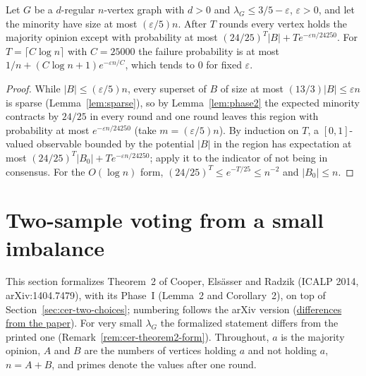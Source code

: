 \begin{theorem}[Theorem~4]\label{thm:expander}
\leanok{}
Let $G$ be a $d$-regular $n$-vertex graph with $d>0$ and $\lambda_G\le3/5-\varepsilon$, $\varepsilon>0$,
and let the minority have size at most $(\varepsilon/5)n$. After $T$ rounds every vertex holds
the majority opinion except with probability at most
$(24/25)^T|B|+Te^{-\varepsilon n/24250}$. For $T=\lceil C\log n\rceil$ with $C=25000$ the failure
probability is at most $1/n+(C\log n+1)e^{-\varepsilon n/C}$, which tends to $0$ for fixed
$\varepsilon$.
\end{theorem}
\begin{proof}\leanok
While $|B|\le(\varepsilon/5)n$, every superset of $B$ of size at most $(13/3)|B|\le\varepsilon n$
is sparse (Lemma~\ref{lem:sparse}), so by Lemma~\ref{lem:phase2} the expected minority contracts by
$24/25$ in every round and one round leaves this region with probability at most
$e^{-\varepsilon n/24250}$ (take $m=(\varepsilon/5)n$). By induction on $T$, a $[0,1]$-valued
observable bounded by the potential $|B|$ in the region has expectation at most
$(24/25)^T|B_0|+Te^{-\varepsilon n/24250}$; apply it to the indicator of not being in consensus.
For the $O(\log n)$ form, $(24/25)^T\le e^{-T/25}\le n^{-2}$ and $|B_0|\le n$.
\end{proof}

\section{Two-sample voting from a small imbalance}\label{sec:cer-small-imbalance}
This section formalizes Theorem~2 of Cooper, Elsässer and Radzik (ICALP 2014, arXiv:1404.7479),
with its Phase~I (Lemma~2 and Corollary~2), on top of
Section~\ref{sec:cer-two-choices}; numbering follows the arXiv version
(\href{https://github.com/formal-dynamics/leanamics/blob/main/median/FORMALIZATION_DIFFERENCES.md#two-sample-voting-on-expanders-from-a-small-imbalance-expandergeneral-roadmap-maj-5-b}{differences
from the paper}). For very small $\lambda_G$ the formalized statement differs from the printed one
(Remark~\ref{rem:cer-theorem2-form}). Throughout, $a$ is the
majority opinion, $A$ and $B$ are the numbers of vertices holding $a$ and not holding $a$,
$n=A+B$, and primes denote the values after one round.

